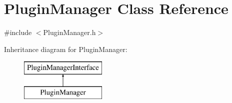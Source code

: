 \hypertarget{class_plugin_manager}{}\section{Plugin\+Manager Class Reference}
\label{class_plugin_manager}


{\ttfamily \#include $<$Plugin\+Manager.\+h$>$}

Inheritance diagram for Plugin\+Manager\+:\begin{figure}[H]
\begin{center}
\leavevmode
\includegraphics[height=2.000000cm]{class_plugin_manager}
\end{center}
\end{figure}
